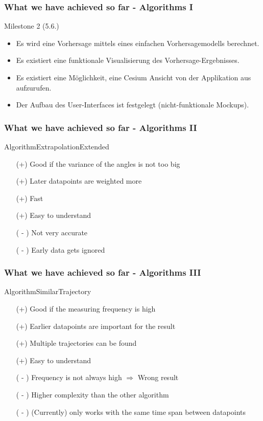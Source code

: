 \documentclass[xcolor=dvipsnames]{beamer}
\begin{document}
\begin{frame}
	\frametitle{What we have achieved so far - Algorithms I}
	\large{Milestone 2 (5.6.)}
	\normalsize
	\begin{itemize} 
		\item \color{Green}Es wird eine Vorhersage mittels eines einfachen Vorhersagemodells berechnet.
		\item \color{LightGray}Es existiert eine funktionale Visualisierung des Vorhersage-Ergebnisses.
		\item \color{LightGray}Es existiert eine Möglichkeit, eine Cesium Ansicht von der Applikation aus aufzurufen.
		\item \color{LightGray}Der Aufbau des User-Interfaces ist festgelegt (nicht-funktionale Mockups).
	\end{itemize}
\end{frame}

\begin{frame}
	\frametitle{What we have achieved so far - Algorithms II}
	\Large{AlgorithmExtrapolationExtended}
	\normalsize{}
			\begin{itemize}
				\item[(+)] Good if the variance of the angles is not too big
				\item[(+)] Later datapoints are weighted more
				\item[(+)] Fast
				\item[(+)] Easy to understand
				\item[] 
				\item[( - )] Not very accurate
				\item[( - )] Early data gets ignored

			\end{itemize}
\end{frame}

\begin{frame}
	\frametitle{What we have achieved so far - Algorithms III}
	\Large{AlgorithmSimilarTrajectory}
	\normalsize{}
			\begin{itemize}
				\item[(+)] Good if the measuring frequency is high
				\item[(+)] Earlier datapoints are important for the result
				\item[(+)] Multiple trajectories can be found
				\item[(+)] Easy to understand
				\item[] 
				\item[( - )] Frequency is not always high $\Rightarrow$ Wrong result
				\item[( - )] Higher complexity than the other algorithm
				\item[( - )] (Currently) only works with the same time span between datapoints
			\end{itemize}
\end{frame}
\end{document}

